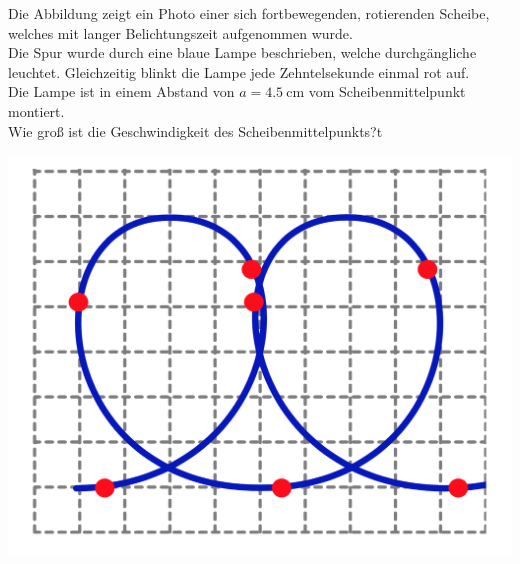\flushleft
\begin{minipage}{.75\textwidth}
\begin{Exercise}[label = rotdisk, title = Rotierende Scheibe, difficulty = 2, origin = \url{Jaan Kalda,http://www.ioc.ee/~kalda/ipho/} ]
Die Abbildung zeigt ein Photo einer sich fortbewegenden, rotierenden Scheibe, welches mit langer Belichtungszeit aufgenommen wurde.\\
Die Spur wurde durch eine blaue Lampe beschrieben, welche durchgängliche leuchtet. Gleichzeitig blinkt die Lampe jede  Zehntelsekunde einmal rot auf.\\
Die Lampe ist in einem Abstand von $a =4.5~\mathrm{cm}$ vom Scheibenmittelpunkt montiert.\\
Wie groß ist die Geschwindigkeit des Scheibenmittelpunkts?t
\end{Exercise}
\end{minipage}
\hfill
\begin{minipage}{.2\textwidth}
	\centering
\includegraphics[scale = .2]{../tasks/kalda/rotdisk.png}
\end{minipage}
